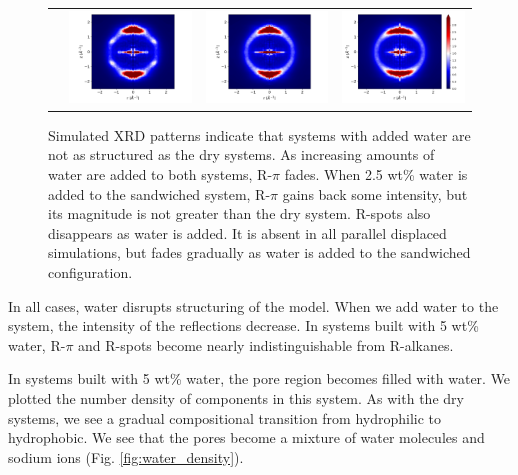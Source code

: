 \documentclass[journal=jpcbfk,manusciprt=article]{achemso}
\begin{document}
\begin{figure}
\begin{tabular}{@{}c@{ }c@{ }c@{ }c@{}}
  	\rowname{Sandwiched}&
  	\includegraphics[width=.28\linewidth,trim={1cm 0 1.3cm 0},clip]{solvated_layered_rzplot_1.png}&
  	\includegraphics[width=.28\linewidth,trim={1cm 0 1.3cm 0},clip]{solvated_layered_rzplot_25.png}&
  	\includegraphics[width=.325\linewidth]{solvated_layered_rzplot_5.png}\\[-1ex]
  	\end{tabular}
	\caption{Simulated XRD patterns indicate that systems with added water
		are not as structured as the dry systems. As increasing amounts of water are 
		added to both systems, R-$\pi$ fades. When 2.5 wt\% water is added to the
		sandwiched system, R-$\pi$ gains back some intensity, but its magnitude is not
		greater than the dry system. R-spots also disappears as water is added. It is
		absent in all parallel displaced simulations, but fades gradually as water is
		added to the sandwiched configuration.}%
  \label{fig:solvation}

  \end{figure}
 
  In all cases, water disrupts structuring of the model.  When we add water to
  the system, the intensity of the reflections decrease. In systems built with 5
  wt\% water, R-$\pi$ and R-spots become nearly indistinguishable from R-alkanes.

  In systems built with 5 wt\% water, the pore region becomes filled with
  water. We plotted the number density of components in this system. As with the 
  dry systems, we see a gradual compositional transition from hydrophilic to hydrophobic.  
  We see that the pores become a mixture of water molecules and sodium ions (Fig.
  \ref{fig:water_density}). 
  
\end{document}
